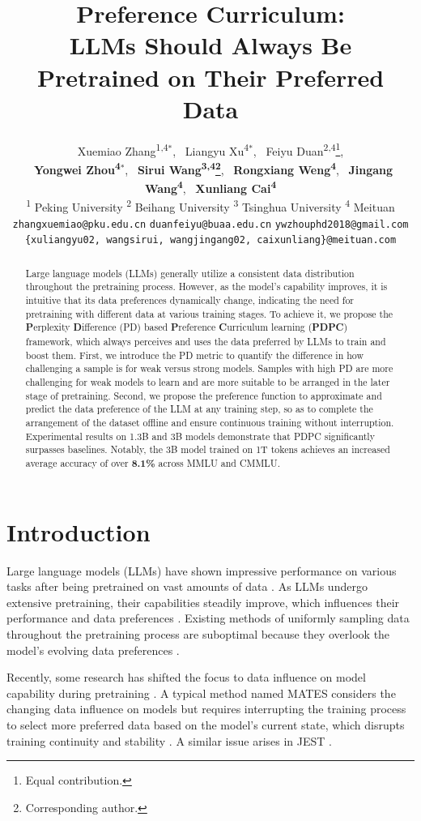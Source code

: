 \documentclass[11pt]{article}
\title{
Preference Curriculum: \\
LLMs Should Always Be Pretrained on Their Preferred Data
}
\author{
    Xuemiao Zhang\textsuperscript{1,4}$^{\ast}$, \ 
    Liangyu Xu\textsuperscript{4}$^{\ast}$, \ 
    Feiyu Duan\textsuperscript{2,4}\thanks{Equal contribution.}, \\ \ 
    \textbf{Yongwei Zhou\textsuperscript{4}}$^{\ast}$, \ 
    \textbf{Sirui Wang\textsuperscript{3,4}\thanks{Corresponding author.}}, \
     \textbf{Rongxiang Weng\textsuperscript{4}}, \
    \textbf{Jingang Wang\textsuperscript{4}}, \ 
    \textbf{Xunliang Cai\textsuperscript{4}}
    \\
    \textsuperscript{1} Peking University\quad
    \textsuperscript{2} Beihang University\quad
    \textsuperscript{3} Tsinghua University\quad
    \textsuperscript{4} Meituan \\
    \texttt{zhangxuemiao@pku.edu.cn}\quad 
    \texttt{duanfeiyu@buaa.edu.cn} \quad \texttt{ywzhouphd2018@gmail.com}\\
    \texttt{\{xuliangyu02, wangsirui, wangjingang02, caixunliang\}@meituan.com} \\
  }
\begin{document}
\maketitle
\begin{abstract}
Large language models (LLMs) generally utilize a consistent data distribution throughout the pretraining process. However, as the model's capability improves, it is intuitive that its data preferences dynamically change, indicating the need for pretraining with different data at various training stages. To achieve it, we propose the \textbf{P}erplexity \textbf{D}ifference (PD) based \textbf{P}reference \textbf{C}urriculum learning (\textbf{PDPC}) framework, which always perceives and uses the data preferred by LLMs to train and boost them. First, we introduce the PD metric to quantify the difference in how challenging a sample is for weak versus strong models. Samples with high PD are more challenging for weak models to learn and are more suitable to be arranged in the later stage of pretraining. Second, we propose the preference function to approximate and predict the data preference of the LLM at any training step, so as to complete the arrangement of the dataset offline and ensure continuous training without interruption.
Experimental results on 1.3B and 3B models demonstrate that PDPC significantly surpasses baselines. Notably, the 3B model trained on 1T tokens achieves an increased average accuracy of over \textbf{8.1\%} across MMLU and CMMLU.
\end{abstract}

\section{Introduction}
\label{sec:intro}
Large language models (LLMs) have shown impressive performance on various tasks after being pretrained on vast amounts of data \cite{touvron2023llama,dubey2024llama,liu2024deepseek}. As LLMs undergo extensive pretraining, their capabilities steadily improve, which influences their performance and data preferences \cite{yu2024mates}. Existing methods of uniformly sampling data throughout the pretraining process are suboptimal because they overlook the model's evolving data preferences \cite{wettig2024qurating,abbas2023semdedup,sachdeva2024train}.

Recently, some research has shifted the focus to data influence on model capability during pretraining \cite{evans2024datacurationjointexample,yu2024mates,koh2017understanding,ko2024mirrored}. A typical method named MATES considers the changing data influence on models but requires interrupting the training process to select more preferred data based on the model's current state, which disrupts training continuity and stability \cite{yu2024mates}. A similar issue arises in JEST \cite{evans2024datacurationjointexample}.
\end{document}
